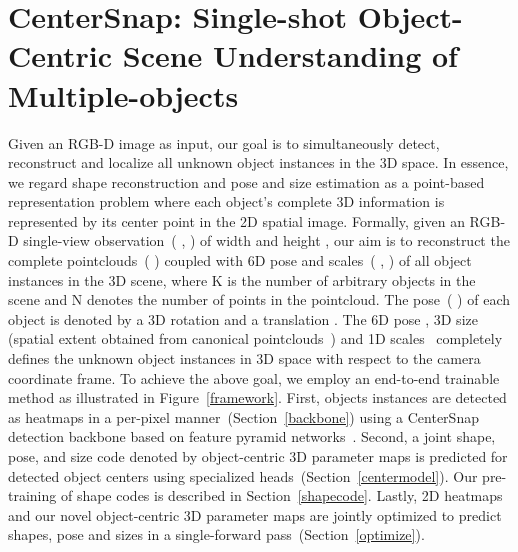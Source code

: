 \documentclass[letter, 10pt, conference]{ieeeconf}
\begin{document}
\section{CenterSnap: Single-shot Object-Centric Scene Understanding of Multiple-objects}\label{centerpoint}

Given an RGB-D image as input, our goal is to simultaneously detect, reconstruct and localize all unknown object instances in the 3D space. In essence, we regard shape reconstruction and pose and size estimation as a point-based representation problem where each object's complete 3D information is represented by its center point in the 2D spatial image. Formally, given an RGB-D single-view observation~(  ,   ) of width  and height , our aim is to reconstruct the complete pointclouds~(  ) coupled with 6D pose and scales~(  ,   ) of all object instances in the 3D scene, where K is the number of arbitrary objects in the scene and N denotes the number of points in the pointcloud. The pose~(  ) of each object is denoted by a 3D rotation    and a translation   . The 6D pose , 3D size (spatial extent obtained from canonical pointclouds~) and 1D scales~ completely defines the unknown object instances in 3D space with respect to the camera coordinate frame.
To achieve the above goal, we employ an end-to-end trainable method as illustrated in Figure~\ref{framework}. First, objects instances are detected as heatmaps in a per-pixel manner~(Section~\ref{backbone}) using a CenterSnap detection backbone based on feature pyramid networks~\cite{laskey2021simnet, lin2017feature}. Second, a joint shape, pose, and size code denoted by object-centric 3D parameter maps is predicted for detected object centers using specialized heads~(Section~\ref{centermodel}). Our pre-training of shape codes is described in Section~\ref{shapecode}. Lastly, 2D heatmaps and our novel object-centric 3D parameter maps are jointly optimized to predict shapes, pose and sizes in a single-forward pass~(Section~\ref{optimize}).
\end{document}
